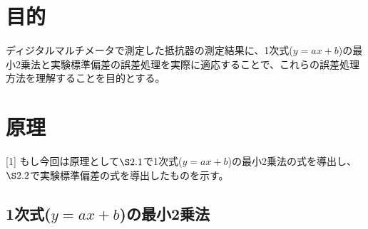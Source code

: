 \documentclass[10pt,a4paper]{jsarticle}
\numberwithin{equation}{section}
\numberwithin{figure}{section}
\numberwithin{table}{section}
\begin{document}
\section{目的}
  ディジタルマルチメータで測定した抵抗器の測定結果に、1次式($y=ax+b$)の最小2乗法と実験標準偏差の誤差処理を実際に適応することで、これらの誤差処理方法を理解することを目的とする。
\section{原理}[1]
  もし今回は原理として$\S2.1$で1次式($y=ax+b$)の最小2乗法の式を導出し、$\S2.2$で実験標準偏差の式を導出したものを示す。
  \subsection{1次式($y=ax+b$)の最小2乗法}
\end{document}

